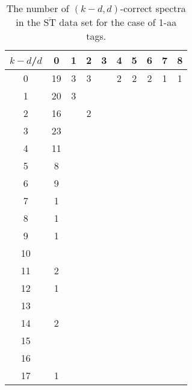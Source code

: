 \documentclass{article}[12pt]
\def\STbar{{\overline{\mathrm{ST}}}}
\begin{document}
\begin{landscape}

\begin{table}[h]\footnotesize
{\centering
\begin{tabular}{|c|c|
c|c|c|c|c|c|c|c|}
  \hline
  $k-d$/$d$ 
 & 0 & 1 & 2 & 3 & 4 & 5 & 6 & 7 & 8\\

  \hline
  \hline

0  & 19 & 3 & 3 &  & 2 & 2 & 2 & 1 & 1\\

1  & 20 & 3 &  &  &  &  &  &  & \\

2  & 16 &  & 2 &  &  &  &  &  & \\

3  & 23 &  &  &  &  &  &  &  & \\

4  & 11 &  &  &  &  &  &  &  & \\

5  & 8 &  &  &  &  &  &  &  & \\

6  & 9 &  &  &  &  &  &  &  & \\

7  & 1 &  &  &  &  &  &  &  & \\

8  & 1 &  &  &  &  &  &  &  & \\

9  & 1 &  &  &  &  &  &  &  & \\

10  &  &  &  &  &  &  &  &  & \\

11  & 2 &  &  &  &  &  &  &  & \\

12  & 1 &  &  &  &  &  &  &  & \\

13  &  &  &  &  &  &  &  &  & \\

14  & 2 &  &  &  &  &  &  &  & \\

15  &  &  &  &  &  &  &  &  & \\

16  &  &  &  &  &  &  &  &  & \\

17  & 1 &  &  &  &  &  &  &  & \\

  \hline
\end{tabular}
\par}
\centering
\caption{The number of $(k-d,d)$-correct spectra in the $\STbar$ data set for the case of 1-aa tags.}
\vspace{3mm}
\label{table:kd-1-correct-ST-bar}
\end{table}
\end{landscape}
\end{document}
